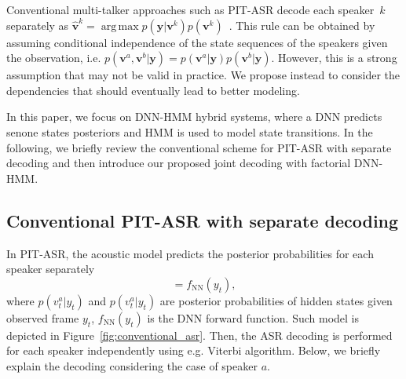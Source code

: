 \documentclass[a4paper]{article}
\newcommand{\spkrA}{a}
\newcommand{\spkrB}{b}
\def\y{{\mathbf y}}
\def\w{{\mathbf v}}
\DeclareMathOperator*{\argmax}{arg\,max}
\DeclareMathOperator*{\dnn}{NN}
\begin{document}
Conventional multi-talker approaches such as PIT-ASR decode each speaker~$k$ separately as $\hat{\w}^k = \argmax p(\y|\w^k) p(\w^k)$~\cite{kolbek2017, QIAN20181}.
This rule can be obtained by assuming conditional independence of the state sequences of the speakers given the observation, i.e. $p(\w^a,\w^b|\y) = p(\w^a|\y)p(\w^b|\y)$.
However, this is a strong assumption that may not be valid in practice. We propose instead to consider the dependencies that should eventually lead to better modeling.

In this paper, we focus on DNN-HMM hybrid systems, where a DNN predicts senone states posteriors and HMM is used to model state transitions. In the following, we briefly review the conventional scheme for PIT-ASR with separate decoding and then introduce our proposed joint decoding with factorial DNN-HMM.


\subsection{Conventional PIT-ASR with separate decoding}
\label{sec:conventional_asr}

In PIT-ASR, the acoustic model predicts the posterior probabilities for each speaker separately
\begin{equation}
    [p(v_t^{\spkrA}|y_t), p(v_t^{\spkrB}|y_t)] = f_{\dnn}(y_t),
    \label{eq:pit_asr}
\end{equation}
where $p(v_t^{\spkrA}|y_t)$ and $p(v_t^{\spkrA}|y_t)$ are posterior probabilities of hidden states given observed frame $y_t$, $f_{\dnn}(y_t)$ is the DNN forward function. Such model is depicted in Figure~\ref{fig:conventional_asr}. Then, the ASR decoding is performed for each speaker independently using e.g. Viterbi algorithm. Below, we briefly explain the decoding considering the case of speaker $\spkrA$.

\end{document}
